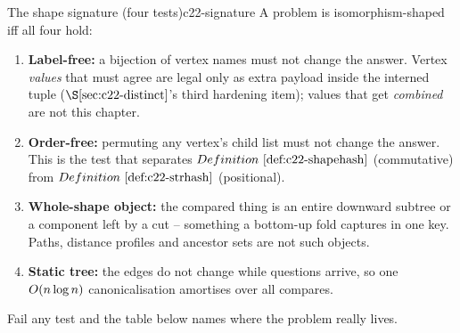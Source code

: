 \begin{definition}{The shape signature (four tests)}{c22-signature}
A problem is isomorphism-shaped iff all four hold:
\begin{enumerate}[nosep,leftmargin=1.6em]
  \item \textbf{Label-free:} a bijection of vertex names must not change the
        answer.  Vertex \emph{values} that must agree are legal only as extra
        payload inside the interned tuple (\(\secref{c22-distinct}\)'s third
        hardening item); values that get \emph{combined} are not this chapter.
  \item \textbf{Order-free:} permuting any vertex's child list must not change
        the answer.  This is the test that separates \(\defref{c22-shapehash}\)
        (commutative) from \(\defref{c22-strhash}\) (positional).
  \item \textbf{Whole-shape object:} the compared thing is an entire downward
        subtree or a component left by a cut -- something a bottom-up fold
        captures in one key.  Paths, distance profiles and ancestor sets are
        not such objects.
  \item \textbf{Static tree:} the edges do not change while questions arrive, so
        one \(O(n\log n)\) canonicalisation amortises over all compares.
\end{enumerate}
Fail any test and the table below names where the problem really lives.
\end{definition}

